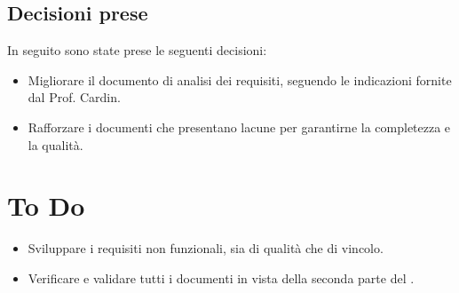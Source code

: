 \documentclass[a4paper, 12pt]{article}
\begin{document}
\subsection{Decisioni prese}
In seguito sono state prese le seguenti decisioni:
\begin{itemize}
    \item Migliorare il documento di analisi dei requisiti, seguendo le indicazioni fornite dal Prof. Cardin.
    \item Rafforzare i documenti che presentano lacune per garantirne la completezza e la qualità.
\end{itemize}

\section{To Do}
\begin{itemize}
    \item Sviluppare i requisiti non funzionali, sia di qualità che di vincolo.
    \item Verificare e validare tutti i documenti in vista della seconda parte del .
\end{itemize}
\end{document}
